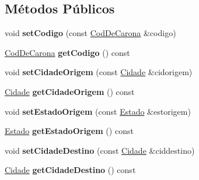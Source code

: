 \subsection*{Métodos Públicos}
\begin{DoxyCompactItemize}
\item 
void {\bfseries set\+Codigo} (const \hyperlink{classshibarides_1_1CodDeCarona}{Cod\+De\+Carona} \&codigo)\hypertarget{classshibarides_1_1Carona_a4c92ff9279cf52a428b8ff25e6a132db}{}\label{classshibarides_1_1Carona_a4c92ff9279cf52a428b8ff25e6a132db}

\item 
\hyperlink{classshibarides_1_1CodDeCarona}{Cod\+De\+Carona} {\bfseries get\+Codigo} () const \hypertarget{classshibarides_1_1Carona_aaf5471db61f27b78a13798003f12439c}{}\label{classshibarides_1_1Carona_aaf5471db61f27b78a13798003f12439c}

\item 
void {\bfseries set\+Cidade\+Origem} (const \hyperlink{classshibarides_1_1Cidade}{Cidade} \&cidorigem)\hypertarget{classshibarides_1_1Carona_a4a47c7f3210c4e9c2d4c380bd6c66682}{}\label{classshibarides_1_1Carona_a4a47c7f3210c4e9c2d4c380bd6c66682}

\item 
\hyperlink{classshibarides_1_1Cidade}{Cidade} {\bfseries get\+Cidade\+Origem} () const \hypertarget{classshibarides_1_1Carona_a01e2983cc1cf3cb30b550d8a38a7a8e1}{}\label{classshibarides_1_1Carona_a01e2983cc1cf3cb30b550d8a38a7a8e1}

\item 
void {\bfseries set\+Estado\+Origem} (const \hyperlink{classshibarides_1_1Estado}{Estado} \&estorigem)\hypertarget{classshibarides_1_1Carona_a72879cb0fe8fa20c740a3069e835571a}{}\label{classshibarides_1_1Carona_a72879cb0fe8fa20c740a3069e835571a}

\item 
\hyperlink{classshibarides_1_1Estado}{Estado} {\bfseries get\+Estado\+Origem} () const \hypertarget{classshibarides_1_1Carona_a27959baa3fab1df9ebabd62aaa2865a1}{}\label{classshibarides_1_1Carona_a27959baa3fab1df9ebabd62aaa2865a1}

\item 
void {\bfseries set\+Cidade\+Destino} (const \hyperlink{classshibarides_1_1Cidade}{Cidade} \&ciddestino)\hypertarget{classshibarides_1_1Carona_a679af6917e6369980427717f986b139a}{}\label{classshibarides_1_1Carona_a679af6917e6369980427717f986b139a}

\item 
\hyperlink{classshibarides_1_1Cidade}{Cidade} {\bfseries get\+Cidade\+Destino} () const \hypertarget{classshibarides_1_1Carona_a9db3d8d18f6b1395770b93ec79da5406}{}\label{classshibarides_1_1Carona_a9db3d8d18f6b1395770b93ec79da5406}


\end{DoxyCompactItemize}
